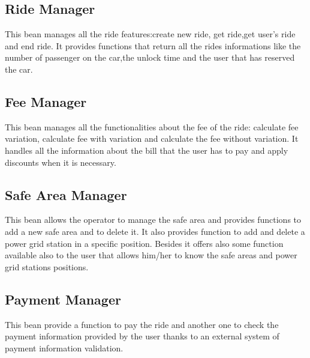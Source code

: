 \subsection{Ride Manager}
This bean manages all the ride features:create new ride, get ride,get user's ride and end ride.
It provides functions that return all the rides informations like the number of passenger on the car,the unlock time and the user that has reserved the car.

\subsection{Fee Manager}
This bean manages all the functionalities about the fee of the ride: calculate fee variation, calculate fee with variation and calculate the fee without variation.
It handles all the information about the bill that the user has to pay and apply discounts when it is necessary.

\subsection{Safe Area Manager}
This bean allows the operator to manage the safe area and provides functions to add a new safe area and to delete it. It also provides function to add and delete a power grid station in a specific position.
Besides it offers also some function available also to the user that allows him/her to know the safe areas and power grid stations positions.

\subsection{Payment Manager}
This bean provide a function to pay the ride and another one to check the payment information provided by the user thanks to an external system of payment information validation.